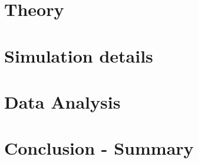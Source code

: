 \documentclass[a4paper, 11pt]{scrreprt}
\begin{document}
	
	\renewcommand{\subsectionautorefname}{section\negthinspace}
	\renewcommand{\subsubsectionautorefname}{section\negthinspace}	\renewcommand{\figureautorefname}{fig.\negthinspace}
	\renewcommand{\tableautorefname}{tab.\negthinspace}
	\renewcommand{\equationautorefname}{eq.\negthinspace}
	
	
	\newcommand{\supervision}{Tanja Schilling}
	\newcommand{\vauthor}{Wilkin Wöhler}
	\newcommand{\vtitle}{Master Thesis}
	\newcommand{\vgroup}{Institute for Soft Matter}
	\newcommand{\vuniversity}{Albert-Ludwigs Universität}
	\newcommand{\vplace}{Freiburg}

	
	
	\newcommand{\presummary}{ A raw writing of hard sphere nucleation, a simulation to measure quantiteis, and a analysis of data generate by means of the simulation.}


\tableofcontents
\newpage

\listoffigures
\pagebreak

\listoftables
\newpage
{} 

\chapter{Theory}

\newpage

\chapter{Simulation details}

\newpage

\chapter{Data Analysis}

\newpage

\chapter{Conclusion - Summary}

\newpage



\printbibliography
\end{document}
